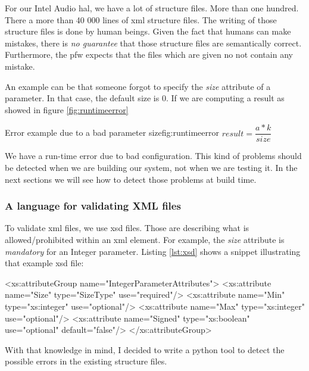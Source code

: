 For our Intel Audio \gls{hal}, we have a lot of structure files. More than one hundred.
There a more than 40 000 lines of \gls{xml} structure files.
The writing of those structure files is done by human beings. Given the fact
that humans can make mistakes, there is \emph{no guarantee} that those structure files are semantically correct.
Furthermore, the \gls{pfw} expects that the files which are given no not contain any mistake.

An example can be that someone forgot to specify the \emph{size} attribute of a parameter.
In that case, the default size is $0$. If we are computing a result as showed in figure \ref{fig:runtimeerror}

\begin{figureGraphics}{Error example due to a bad parameter size}{fig:runtimeerror}
    $result = \dfrac{a*k}{size}$
    \vspace{0.3cm}
\end{figureGraphics}

We have a run-time error due to bad configuration. This kind of problems should be detected when we are building our system,
not when we are testing it.
In the next sections we will see how to detect those problems at build time.


\subsubsection{A language for validating XML files}

To validate \gls{xml} files, we use \gls{xsd} files.
Those are describing what is allowed/prohibited within an \gls{xml} element. For example, the \emph{size} attribute is
\emph{mandatory} for an Integer parameter.
Listing \ref{lst:xsd} shows a snippet illustrating that example \gls{xsd} file:

\begin{code}[language=XML, caption=XSD rules for an Integer parameter, label=lst:xsd]
<xs:attributeGroup name="IntegerParameterAttributes">
    <xs:attribute name="Size" type="SizeType" use="required"/>
    <xs:attribute name="Min" type="xs:integer" use="optional"/>
    <xs:attribute name="Max" type="xs:integer" use="optional"/>
    <xs:attribute name="Signed" type="xs:boolean" use="optional" default="false"/>
</xs:attributeGroup>
\end{code}

With that knowledge in mind, I decided to write a \gls{python} tool to detect the possible errors in the existing structure files.

